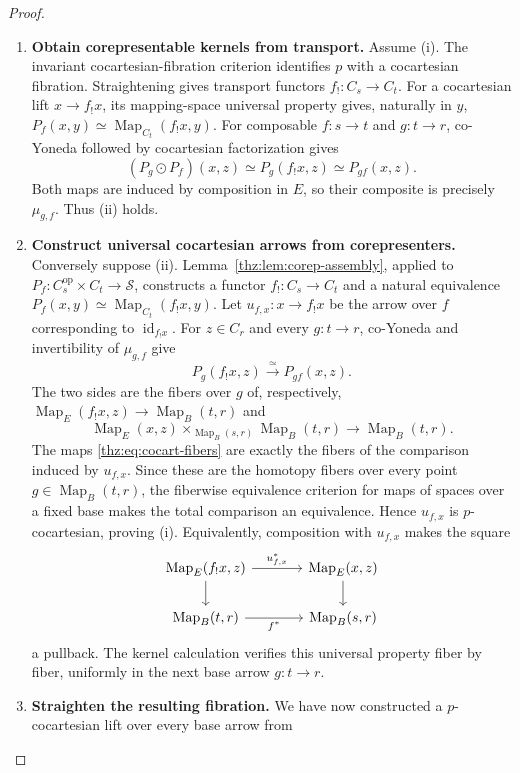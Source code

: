 \documentclass[oneside]{article}
\theoremstyle{plain}
\theoremstyle{definition}
\theoremstyle{remark}
\newcommand{\Map}{\operatorname{Map}}
\newcommand{\Sps}{\mathcal S}
\newcommand{\id}{\operatorname{id}}
\newcommand{\op}{\mathrm{op}}
\begin{document}
\begin{proof}
\leavevmode
\begin{enumerate}
\item \textbf{Obtain corepresentable kernels from transport.} Assume (i).  The invariant cocartesian-fibration criterion identifies $p$ with
a cocartesian fibration.  Straightening gives transport functors
$f_!:C_s\to C_t$.  For a cocartesian lift $x\to f_!x$, its mapping-space
universal property gives, naturally in $y$, $P_f(x,y)\simeq\Map_{C_t}(f_!x,y).$ For composable $f:s\to t$ and $g:t\to r$, co-Yoneda followed by
cocartesian factorization gives
\[
 (P_g\odot P_f)(x,z)
 \simeq P_g(f_!x,z)
 \simeq P_{gf}(x,z).
\]
Both maps are induced by composition in $E$, so their composite is precisely
$\mu_{g,f}$.  Thus (ii) holds.
\item \textbf{Construct universal cocartesian arrows from corepresenters.} Conversely suppose (ii).  Lemma~\ref{thz:lem:corep-assembly}, applied to
$P_f:C_s^{\op}\times C_t\to\Sps$, constructs a functor
$f_!:C_s\to C_t$ and a natural equivalence $P_f(x,y)\simeq\Map_{C_t}(f_!x,y).$ Let $u_{f,x}:x\longrightarrow f_!x$ be the arrow over $f$ corresponding to $\id_{f_!x}$.  For $z\in C_r$
and every $g:t\to r$, co-Yoneda and invertibility of $\mu_{g,f}$ give
\begin{equation}\label{thz:eq:cocart-fibers}
 P_g(f_!x,z)\xrightarrow{\simeq}P_{gf}(x,z).
\end{equation}
The two sides are the fibers over $g$ of, respectively, $\Map_E(f_!x,z)\longrightarrow\Map_B(t,r)$ and
\[
 \Map_E(x,z)\times_{\Map_B(s,r)}\Map_B(t,r)
 \longrightarrow\Map_B(t,r).
\]
The maps \eqref{thz:eq:cocart-fibers} are exactly the fibers of the
comparison induced by $u_{f,x}$.  Since these are the homotopy fibers over every point
$g\in\Map_B(t,r)$, the fiberwise equivalence criterion for maps of spaces
over a fixed base makes the total comparison an equivalence.  Hence
$u_{f,x}$ is $p$-cocartesian, proving (i).
Equivalently, composition with $u_{f,x}$ makes the square
\[
\begin{tikzcd}[column sep=large]
 \Map_E(f_!x,z)\ar[r,"u_{f,x}^*"]\ar[d]&
 \Map_E(x,z)\ar[d]\\
 \Map_B(t,r)\ar[r,"f^*"']&\Map_B(s,r)
\end{tikzcd}
\]
a pullback. The kernel calculation verifies this universal property
fiber by fiber, uniformly in the next base arrow $g:t\to r$.
\item \textbf{Straighten the resulting fibration.} We have now constructed a $p$-cocartesian lift over every base arrow from

\end{enumerate}
\end{proof}
\end{document}
